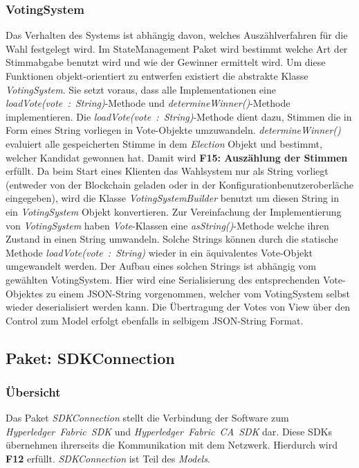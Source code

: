 \documentclass[parskip=full]{scrartcl}
\newcommand{\textitx}[1]{\mbox{\textit{#1}}}
\begin{document}
		\subsubsection{VotingSystem}
		Das Verhalten des Systems ist abhängig davon, welches Auszählverfahren für die Wahl festgelegt wird. Im StateManagement Paket wird bestimmt welche Art der Stimmabgabe benutzt wird und wie der Gewinner ermittelt wird.
		Um diese Funktionen objekt-orientiert zu entwerfen existiert die abstrakte Klasse \textitx{VotingSystem}. Sie setzt voraus, dass alle Implementationen eine \textitx{loadVote(vote : String)}-Methode und \textitx{determineWinner()}-Methode implementieren. Die \textitx{loadVote(vote : String)}-Methode dient dazu, Stimmen die in Form eines String vorliegen in Vote-Objekte umzuwandeln. \textitx{determineWinner()} evaluiert alle gespeicherten Stimme in dem \textitx{Election} Objekt und bestimmt, welcher Kandidat gewonnen hat. Damit wird \textbf{F15: Auszählung der Stimmen} erfüllt.
		Da beim Start eines Klienten das Wahlsystem nur als String vorliegt (entweder von der Blockchain geladen oder in der Konfigurationbenutzeroberläche eingegeben), wird die Klasse \textit{VotingSystemBuilder} benutzt um diesen String in ein \textitx{VotingSystem} Objekt konvertieren.
		Zur Vereinfachung der Implementierung von \textitx{VotingSystem} haben \textitx{Vote}-Klassen eine \textitx{asString()}-Methode welche ihren Zustand in einen String umwandeln. Solche Strings können durch die statische Methode \textitx{loadVote(vote : String)} wieder in ein äquivalentes Vote-Objekt umgewandelt werden. Der Aufbau eines solchen Strings ist abhängig vom gewählten VotingSystem. Hier wird eine Serialisierung des entsprechenden Vote-Objektes zu einem JSON-String vorgenommen, welcher vom VotingSystem selbst wieder deserialisiert werden kann. Die Übertragung der Votes von View über den Control zum Model erfolgt ebenfalls in selbigem JSON-String Format.
	
	\subsection{Paket: SDKConnection}
	\subsubsection{Übersicht}
	Das Paket \textitx{SDKConnection} stellt die Verbindung der Software zum \textitx{Hyperledger Fabric SDK} und \textitx{Hyperledger Fabric CA SDK} dar. Diese SDKs übernehmen ihrerseits die Kommunikation mit dem Netzwerk. Hierdurch wird \textbf{F12} erfüllt. \textitx{SDKConnection} ist Teil des \textitx{Models}.
\end{document}

